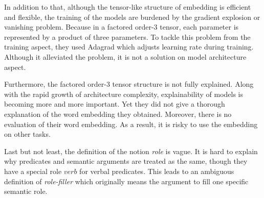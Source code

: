 \documentclass[a4paper]{article}
\begin{document}
In addition to that, although the tensor-like structure of embedding is efficient and flexible, the training of the models are burdened by the gradient explosion or vanishing problem. Because in a factored order-3 tensor, each parameter is represented by a product of three parameters. To tackle this problem from the training aspect, they used Adagrad \citep{duchi2011adaptive} which adjusts learning rate during training. Although it alleviated the problem, it is not a solution on model architecture aspect. 

Furthermore, the factored order-3 tensor structure is not fully explained. Along with the rapid growth of architecture complexity, explainability of models is becoming more and more important. Yet they did not give a thorough explanation of the word embedding they obtained. Moreover, there is no evaluation of their word embedding. As a result, it is risky to use the embedding on other tasks. 

Last but not least, the definition of the notion \textit{role} is vague. It is hard to explain why predicates and semantic arguments are treated as the same, though they have a special role $verb$ for verbal predicates. This leads to an ambiguous definition of \textit{role-filler} which originally means the argument to fill one specific semantic role. 
% 
% 
% 
% 
% 
%
\end{document}

